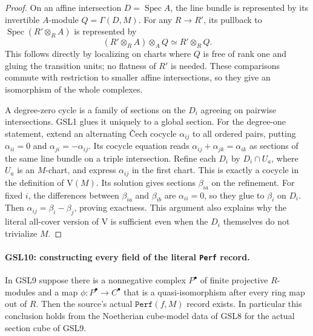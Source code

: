 \begin{proof}
On an affine intersection $D=\operatorname{Spec}A$, the line bundle
is represented by its invertible $A$-module $Q=\Gamma(D,M)$.
For any $R\to R'$, its pullback to
$\operatorname{Spec}(R'\otimes_R A)$ is represented by
\[
 (R'\otimes_R A)\otimes_AQ\simeq R'\otimes_RQ.
\]
This follows directly by localizing on charts where $Q$ is free of
rank one and gluing the transition units; no flatness of $R'$ is
needed.  These comparisons commute with restriction to smaller affine
intersections, so they give an isomorphism of the whole complexes.

A degree-zero cycle is a family of sections on the $D_i$ agreeing
on pairwise intersections.  GSL1 glues it uniquely to a global
section.  For the degree-one statement, extend an alternating
\v Cech cocycle $\alpha_{ij}$ to all ordered pairs, putting
$\alpha_{ii}=0$ and $\alpha_{ji}=-\alpha_{ij}$.  Its cocycle
equation reads $\alpha_{ij}+\alpha_{jk}=\alpha_{ik}$ as sections
of the same line bundle on a triple intersection.  Refine each $D_i$
by $D_i\cap U_a$, where $U_a$ is an $M$-chart, and express
$\alpha_{ij}$ in the first chart.  This is exactly a cocycle in
the definition of $\mathrm V(M)$.  Its solution gives sections
$\beta_{ia}$ on the refinement.  For fixed $i$, the differences
between $\beta_{ia}$ and $\beta_{ib}$ are $\alpha_{ii}=0$,
so they glue to $\beta_i$ on $D_i$.  Then
$\alpha_{ij}=\beta_i-\beta_j$, proving exactness.  This argument
also explains why the literal all-cover version of $\mathrm V$
is sufficient even when the $D_i$ themselves do not trivialize $M$.
\end{proof}

\paragraph{GSL10: constructing every field of the literal \texttt{Perf} record.}
\label{claim:GSL10}
In GSL9 suppose there is a nonnegative complex $P^\bullet$ of
finite projective $R$-modules and a map
$\phi:P^\bullet\to C^\bullet$ that is a quasi-isomorphism after
every ring map out of $R$.  Then the source's actual
$\texttt{Perf}(f,M)$ record exists.  In particular this conclusion
holds from the Noetherian cube-model data of GSL8 for the actual
section cube of GSL9.

